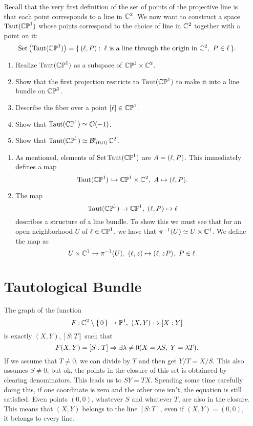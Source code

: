 \documentclass[12pt]{memoir}
\begin{document}
\begin{Ej}
    Recall that the very first definition of the set of points of the projective line is that each point corresponds to a line in $\mathbb{C}^2$. We now want to construct a space $\operatorname{Taut}(\mathbb{CP}^1)$ whose points correspond to the choice of line in $\mathbb{C}^2$ together with a point on it:
    $$\text{Set}\left(\Taut(\bCP^1)\right)=\set{(\l,P)\:\ \l\text{ is a line through the origin in }\bC^2,\ P\in\l}.$$
    \begin{enumerate}
        \item Realize $\operatorname{Taut}(\mathbb{CP}^1)$ as a subspace of $\mathbb{CP}^1\times\mathbb{C}^2$.
        \item Show that the first projection restricts to $\operatorname{Taut}(\mathbb{CP}^1)$ to make it into a line bundle on $\mathbb{CP}^1$.
        \item Describe the fiber over a point $[\ell]\in\mathbb{CP}^1$.
        \item Show that $\operatorname{Taut}(\mathbb{CP}^1)\simeq \mathcal{O}(-1)$.
        \item Show that $\operatorname{Taut}(\mathbb{CP}^1)\simeq \operatorname{\mathcal{B}\!\ell}_{(0,0)}\mathbb{C}^2$.
    \end{enumerate}
\end{Ej}

\begin{ptcbr}
    \begin{enumerate}
        \item As mentioned, elements of $\text{Set}\operatorname{Taut}(\mathbb{CP}^1)$ are $A=(\ell,P)$. This immediately defines a map 
        $$\Taut(\bCP^1)\hookto\bCP^1\x\bC^2,\ A\mapsto (\l,P).$$
        \item The map 
        $$\Taut(\bCP^1)\to\bCP^1,\ (\l,P)\mapsto \l$$
        describes a structure of a line bundle. To show this we must see that for an open neighborhood $U$ of $\ell\in\mathbb{CP}^1$, we have that $\pi^{-1}(U)\simeq U\times\mathbb{C}^1$. We define the map as 
        $$U\x\bC^1\to\pi^{-1}(U),\ (\l,z)\mapsto(\l,zP),\ P\in\l.$$
    \end{enumerate}
\end{ptcbr}

\section{Tautological Bundle}

The graph of the function 
$$F\mathbin{:} \mathbb{C}^2\setminus\{\,0\,\}\to\mathbb{P}^1,\ (X,Y)\mapsto[X:Y]$$
is exactly $(X,Y),[S:T]$ such that 
$$F(X,Y)=[S:T]\Rightarrow\exists\lambda\neq 0(X=\lambda S,\ Y=\lambda T).$$
If we assume that $T\neq 0$, we can divide by $T$ and then get $Y/T=X/S$. This also assumes $S\neq 0$, but ok, the points in the closure of this set is obtaineed by clearing denominators. This leads us to $SY=TX$. Spending some time carefully doing this, if one coordinate is zero and the other one isn't, the equation is still satisfied. Even points $(0,0)$, whatever $S$ and whatever $T$, are also in the closure. This means that $(X,Y)$ belongs to the line $[S:T]$, even if $(X,Y)=(0,0)$, it belongs to every line.
\end{document}
